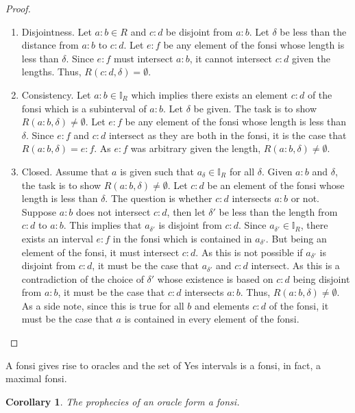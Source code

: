 \documentclass[12pt]{article}
\newtheorem{corollary}{Corollary}[section]
\begin{document}
\begin{proof}
\begin{enumerate}
        \item Disjointness. Let $a:b \in R$ and $c:d$ be disjoint from $a:b$. Let $\delta$ be less than the distance from $a:b$ to $c:d$. Let $e:f$ be any element of the fonsi whose length is less than $\delta$. Since $e:f$ must intersect $a:b$, it cannot intersect $c:d$ given the lengths. Thus, $R(c:d, \delta) = \emptyset$. 
    
        \item Consistency. Let $a:b \in \mathbb{I}_R$ which implies there exists an element $c:d$ of the fonsi which is a subinterval of $a:b$. Let  $ \delta$ be given. The task is to show $R(a:b, \delta) \neq \emptyset$. Let $e:f$ be any element of the fonsi whose length is less than $\delta$. Since $e:f$ and $c:d$ intersect as they are both in the fonsi, it is the case that $R(a:b, \delta) = e:f$. As $e:f$ was arbitrary given the length, $R(a:b, \delta) \neq \emptyset$. 
        
        \item Closed. Assume that $a$ is given such that $a_\delta \in \mathbb{I}_R$ for all $\delta$. Given $a:b$ and $\delta$, the task is to show $R(a:b, \delta) \neq \emptyset$. Let $c:d$ be an element of the fonsi whose length is less than $\delta$. The question is whether $c:d$ intersects $a:b$ or not. Suppose $a:b$ does not intersect $c:d$, then let $\delta'$  be less than the length from $c:d$ to $a:b$. This implies that $a_{\delta'}$ is disjoint from $c:d$. Since $a_{\delta'} \in \mathbb{I}_R$, there exists an interval $e:f$ in the fonsi which is contained in $a_{\delta'}$. But being an element of the fonsi, it must intersect $c:d$. As this is not possible if $a_{\delta'}$ is disjoint from $c:d$, it must be the case that $a_{\delta'}$ and $c:d$ intersect. As this is a contradiction of the choice of $\delta'$ whose existence is based on $c:d$ being disjoint from $a:b$, it must be the case that $c:d$ intersects $a:b$. Thus, $R(a:b, \delta) \neq \emptyset$. As a side note, since this is true for all $b$ and elements $c:d$ of the fonsi, it must be the case that $a$ is contained in every element of the fonsi. 
    \end{enumerate}

\end{proof}

A fonsi gives rise to oracles and the set of Yes intervals is a fonsi, in fact, a maximal fonsi. 


\begin{corollary}
    The prophecies of an oracle form a fonsi.
\end{corollary}
\end{document}
